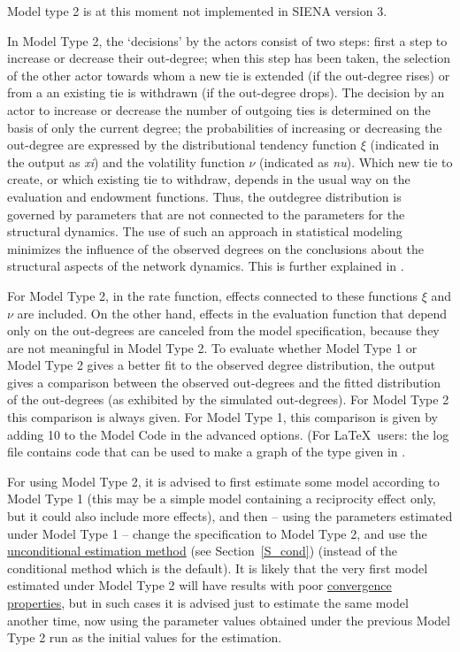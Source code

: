 \documentclass[a4paper,fleqn]{article}
\newcommand{\+}{\, + \,}
\newcommand{\SI}{{\sf SIENA }}
\begin{document}
{Model type 2 is at this moment not implemented in \SI version 3.
\medskip
\fi

\iffalse
In Model Type 2, the `decisions' by the actors
consist of two steps: first a step to increase or decrease their
out-degree; when this step has been taken, the selection of the
other actor towards whom a new tie is extended (if the out-degree
rises) or from a an existing tie is withdrawn (if the out-degree
drops).
The decision by an actor to increase or decrease the number of outgoing ties
is determined on the basis
of only the current degree; the probabilities of increasing or
decreasing the out-degree are expressed by the distributional
tendency function $\xi$ (indicated in the output as \emph{xi}) and
the volatility function $\nu$ (indicated as \emph{nu}). Which new
tie to create, or which existing tie to withdraw, depends in the
usual way on the evaluation and endowment functions. Thus, the
outdegree distribution is governed by parameters that are not
connected to the parameters for the structural dynamics. The use of
such an approach in statistical modeling minimizes the influence of
the observed degrees on the conclusions about the structural aspects
of the network dynamics. This is further explained in \citet{Snijders03}.

For Model Type 2, in the rate function, effects connected to these
functions $\xi$ and $\nu$ are included. On the other hand, effects
in the evaluation function that depend only on the out-degrees are
canceled from the model specification, because they are not
meaningful in Model Type 2. To evaluate whether Model Type 1 or
Model Type 2 gives a better fit to the observed degree distribution,
the output gives a comparison between the observed out-degrees and
the fitted distribution of the out-degrees (as exhibited by the
simulated out-degrees). For Model Type 2 this comparison is always
given. For Model Type 1, this comparison is given by adding 10 to the
Model Code in the advanced options. (For \LaTeX\ users: the log
file contains code that can be used to make a graph of the type
given in \citet{Snijders03}.

For using Model Type 2, it is advised to first estimate some model
according to Model Type 1 (this may be a simple model containing a
reciprocity effect only, but it could also include more effects),
and then -- using the parameters estimated under Model Type 1 --
change the specification to Model Type 2, and use the
\hyperlink{T_S_cond}{unconditional estimation method}
(see Section~\ref{S_cond}) (instead of the conditional method which is the
default). It is likely that the very first model estimated under
Model Type 2 will have results with poor
\hyperlink{T_convergence}{convergence properties}, but in such
cases it is advised just to estimate the same model another time,
now using the parameter values obtained under the previous Model
Type 2 run as the initial values for the estimation.

}
\end{document}
